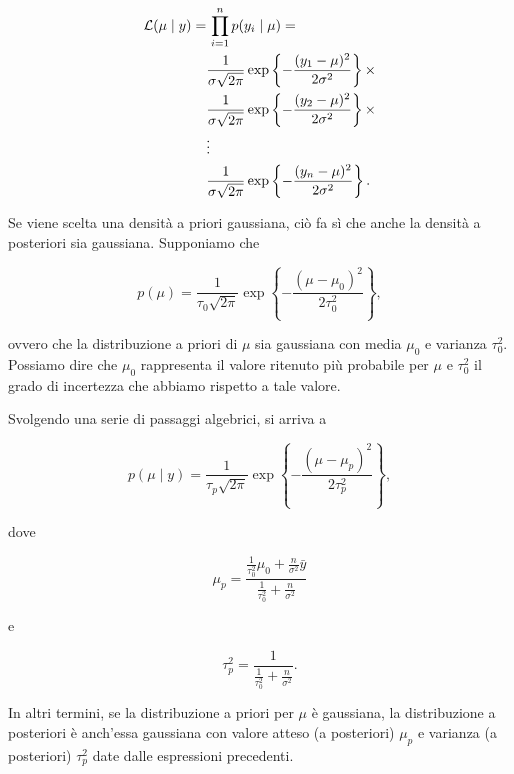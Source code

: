 \documentclass[
  11pt,
]{krantz}
\theoremstyle{definition}
\theoremstyle{definition}
\theoremstyle{definition}
\theoremstyle{definition}
\theoremstyle{remark}
\begin{document}
\begin{align}
\mathcal{L}(\mu \mid y) =& \, \prod_{i=1}^n p(y_i \mid \mu) = \notag\\
& \frac{1}{{\sigma \sqrt {2\pi}}}\exp\left\{{-\frac{(y_1 - \mu)^2}{2\sigma^2}}\right\} \times \notag\\
 & \frac{1}{{\sigma \sqrt {2\pi}}}\exp\left\{{-\frac{(y_2 - \mu)^2}{2\sigma^2}}\right\} \times  \notag\\
& \vdots \notag\\
 & \frac{1}{{\sigma \sqrt {2\pi}}}\exp\left\{{-\frac{(y_n - \mu)^2}{2\sigma^2}}\right\}.
\end{align}

Se viene scelta una densità a priori gaussiana, ciò fa sì che anche la densità a posteriori sia gaussiana. Supponiamo che

\begin{equation}
p(\mu) = \frac{1}{{\tau_0 \sqrt {2\pi}}}\exp\left\{{-\frac{(\mu - \mu_0)^2}{2\tau_0^2}}\right\},
\label{eq:prior-mu-norm-norm}
\end{equation}

ovvero che la distribuzione a priori di \(\mu\) sia gaussiana con media \(\mu_0\) e varianza \(\tau_0^2\). Possiamo dire che \(\mu_0\) rappresenta il valore ritenuto più probabile per \(\mu\) e \(\tau_0^2\) il grado di incertezza che abbiamo rispetto a tale valore.

Svolgendo una serie di passaggi algebrici, si arriva a

\begin{equation}
p(\mu \mid y) = \frac{1}{{\tau_p \sqrt {2\pi}}}\exp\left\{{-\frac{(\mu - \mu_p)^2}{2\tau_p^2}}\right\},
\label{eq:post-norm-norm}
\end{equation}

dove

\begin{equation}
\mu_p = \frac{\frac{1}{\tau_0^2}\mu_0+ \frac{n}{\sigma^2}\bar{y}}{\frac {1}{\tau_0^2} + \frac{n}{\sigma^2}} 
\label{eq:post-norm-mup}
\end{equation}

e

\begin{equation}
\tau_p^2 = \frac{1}{\frac {1}{\tau_0^2}+ \frac{n}{\sigma^2}}.
\label{eq:post-norm-taup2}
\end{equation}

In altri termini, se la distribuzione a priori per \(\mu\) è gaussiana, la distribuzione a posteriori è anch'essa gaussiana con valore atteso (a posteriori) \(\mu_p\) e varianza (a posteriori) \(\tau_p^2\) date dalle espressioni precedenti.
\end{document}
